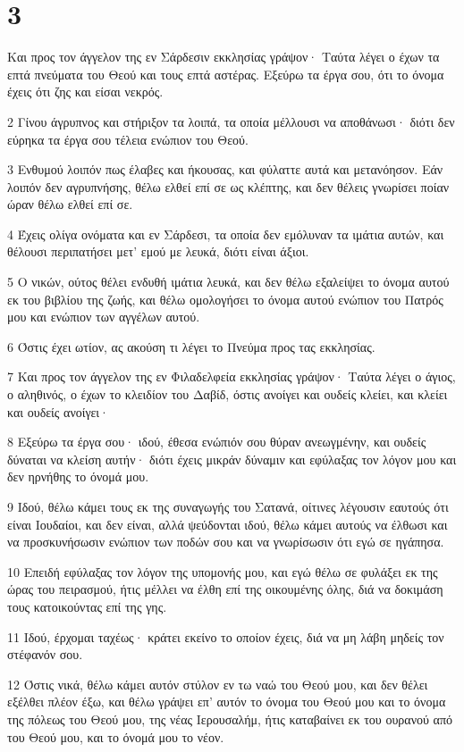 \chapter{3}

\par Και προς τον άγγελον της εν Σάρδεσιν εκκλησίας γράψον· Ταύτα λέγει ο έχων τα επτά πνεύματα του Θεού και τους επτά αστέρας. Εξεύρω τα έργα σου, ότι το όνομα έχεις ότι ζης και είσαι νεκρός.
\par 2 Γίνου άγρυπνος και στήριξον τα λοιπά, τα οποία μέλλουσι να αποθάνωσι· διότι δεν εύρηκα τα έργα σου τέλεια ενώπιον του Θεού.
\par 3 Ενθυμού λοιπόν πως έλαβες και ήκουσας, και φύλαττε αυτά και μετανόησον. Εάν λοιπόν δεν αγρυπνήσης, θέλω ελθεί επί σε ως κλέπτης, και δεν θέλεις γνωρίσει ποίαν ώραν θέλω ελθεί επί σε.
\par 4 Έχεις ολίγα ονόματα και εν Σάρδεσι, τα οποία δεν εμόλυναν τα ιμάτια αυτών, και θέλουσι περιπατήσει μετ' εμού με λευκά, διότι είναι άξιοι.
\par 5 Ο νικών, ούτος θέλει ενδυθή ιμάτια λευκά, και δεν θέλω εξαλείψει το όνομα αυτού εκ του βιβλίου της ζωής, και θέλω ομολογήσει το όνομα αυτού ενώπιον του Πατρός μου και ενώπιον των αγγέλων αυτού.
\par 6 Όστις έχει ωτίον, ας ακούση τι λέγει το Πνεύμα προς τας εκκλησίας.
\par 7 Και προς τον άγγελον της εν Φιλαδελφεία εκκλησίας γράψον· Ταύτα λέγει ο άγιος, ο αληθινός, ο έχων το κλειδίον του Δαβίδ, όστις ανοίγει και ουδείς κλείει, και κλείει και ουδείς ανοίγει·
\par 8 Εξεύρω τα έργα σου· ιδού, έθεσα ενώπιόν σου θύραν ανεωγμένην, και ουδείς δύναται να κλείση αυτήν· διότι έχεις μικράν δύναμιν και εφύλαξας τον λόγον μου και δεν ηρνήθης το όνομά μου.
\par 9 Ιδού, θέλω κάμει τους εκ της συναγωγής του Σατανά, οίτινες λέγουσιν εαυτούς ότι είναι Ιουδαίοι, και δεν είναι, αλλά ψεύδονται ιδού, θέλω κάμει αυτούς να έλθωσι και να προσκυνήσωσιν ενώπιον των ποδών σου και να γνωρίσωσιν ότι εγώ σε ηγάπησα.
\par 10 Επειδή εφύλαξας τον λόγον της υπομονής μου, και εγώ θέλω σε φυλάξει εκ της ώρας του πειρασμού, ήτις μέλλει να έλθη επί της οικουμένης όλης, διά να δοκιμάση τους κατοικούντας επί της γης.
\par 11 Ιδού, έρχομαι ταχέως· κράτει εκείνο το οποίον έχεις, διά να μη λάβη μηδείς τον στέφανόν σου.
\par 12 Όστις νικά, θέλω κάμει αυτόν στύλον εν τω ναώ του Θεού μου, και δεν θέλει εξέλθει πλέον έξω, και θέλω γράψει επ' αυτόν το όνομα του Θεού μου και το όνομα της πόλεως του Θεού μου, της νέας Ιερουσαλήμ, ήτις καταβαίνει εκ του ουρανού από του Θεού μου, και το όνομά μου το νέον.
